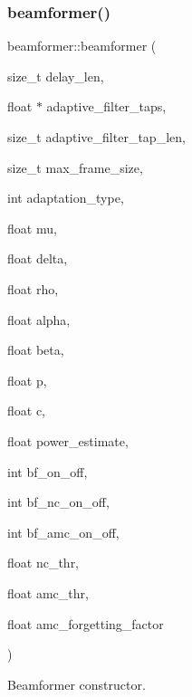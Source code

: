 \subsubsection{\texorpdfstring{beamformer()}{beamformer()}}
{\footnotesize\ttfamily beamformer\+::beamformer (\begin{DoxyParamCaption}\item[{size\+\_\+t}]{delay\+\_\+len,  }\item[{float $\ast$}]{adaptive\+\_\+filter\+\_\+taps,  }\item[{size\+\_\+t}]{adaptive\+\_\+filter\+\_\+tap\+\_\+len,  }\item[{size\+\_\+t}]{max\+\_\+frame\+\_\+size,  }\item[{int}]{adaptation\+\_\+type,  }\item[{float}]{mu,  }\item[{float}]{delta,  }\item[{float}]{rho,  }\item[{float}]{alpha,  }\item[{float}]{beta,  }\item[{float}]{p,  }\item[{float}]{c,  }\item[{float}]{power\+\_\+estimate,  }\item[{int}]{bf\+\_\+on\+\_\+off,  }\item[{int}]{bf\+\_\+nc\+\_\+on\+\_\+off,  }\item[{int}]{bf\+\_\+amc\+\_\+on\+\_\+off,  }\item[{float}]{nc\+\_\+thr,  }\item[{float}]{amc\+\_\+thr,  }\item[{float}]{amc\+\_\+forgetting\+\_\+factor }\end{DoxyParamCaption})\hspace{0.3cm}{\ttfamily [explicit]}}



Beamformer constructor. 


